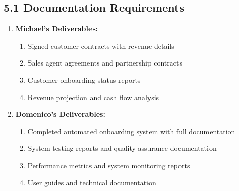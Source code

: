 \subsection*{5.1 Documentation Requirements}
\begin{enumerate}[label=\arabic*.]
\item \textbf{Michael's Deliverables:}
    \begin{enumerate}[label=(\alph*)]
    \item Signed customer contracts with revenue details
    \item Sales agent agreements and partnership contracts
    \item Customer onboarding status reports
    \item Revenue projection and cash flow analysis
    \end{enumerate}

\item \textbf{Domenico's Deliverables:}
    \begin{enumerate}[label=(\alph*)]
    \item Completed automated onboarding system with full documentation
    \item System testing reports and quality assurance documentation
    \item Performance metrics and system monitoring reports
    \item User guides and technical documentation
    \end{enumerate}
\end{enumerate}

